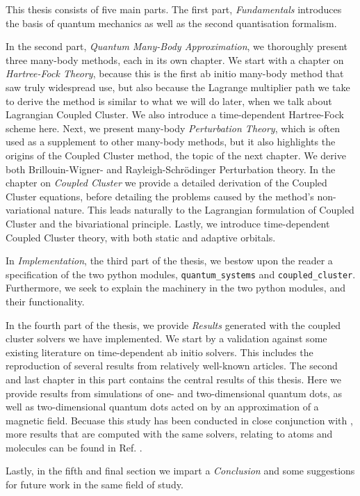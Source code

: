     This thesis consists of five main parts. The first part, \emph{Fundamentals} 
    introduces the basis of quantum mechanics as well as the second quantisation 
    formalism.
    
    In the second part, \emph{Quantum Many-Body Approximation}, we 
    thoroughly present three many-body methods, each in its own chapter.
    We start with a chapter on \emph{Hartree-Fock Theory}, because this is 
    the first ab initio many-body method that saw truly widespread use, but 
    also because the Lagrange multiplier path we take to derive the method is 
    similar to what we will do later, when we talk about Lagrangian Coupled Cluster.
    We also introduce a time-dependent Hartree-Fock scheme here.
    Next, we present many-body \emph{Perturbation Theory}, which is often used as
    a supplement to other many-body methods, but it also highlights the origins 
    of the Coupled Cluster method, the topic of the next chapter.
    We derive both Brillouin-Wigner- and Rayleigh-Schrödinger Perturbation theory. 
    In the chapter on \emph{Coupled Cluster} we provide a detailed derivation
    of the Coupled Cluster equations, before detailing the problems caused 
    by the method's non-variational nature. This leads naturally to 
    the Lagrangian formulation of Coupled Cluster\cite{helgaker1988analytical}
    and the bivariational principle\cite{arponen1983variational}. Lastly,
    we introduce time-dependent Coupled Cluster theory, with both static and 
    adaptive orbitals\cite{kvaal2012ab}.

    In \emph{Implementation}, the third part of the thesis, we bestow upon the reader 
    a specification of the two python modules, \lstinline{quantum_systems} 
    and \lstinline{coupled_cluster}. Furthermore, we seek to explain the machinery
    in the two python modules, and their functionality. 

    In the fourth part of the thesis, we provide \emph{Results} generated with the
    coupled cluster solvers we have implemented. We start by a validation against
    some existing literature on time-dependent ab initio solvers. This includes 
    the reproduction of several results from relatively well-known articles. 
    The second and last chapter in this part contains the central results of 
    this thesis. Here we provide results from simulations of one- and two-dimensional 
    quantum dots, as well as two-dimensional quantum 
    dots acted on by an approximation of a magnetic field. Becuase this study 
    has been conducted in close conjunction with
    \citeauthor{islandwind2019}, more results that are computed with the 
    same solvers, relating to atoms and molecules can be found in Ref.
    \cite{islandwind2019}.
   
    Lastly, in the fifth and final section we impart a \emph{Conclusion} and 
    some suggestions for future work in the same field of study.
